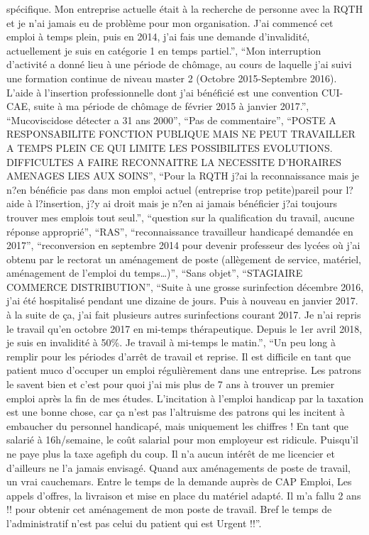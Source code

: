 \documentclass[
  letterpaper,
  DIV=11,
  numbers=noendperiod]{scrartcl}
\begin{document}
\begin{itemize}
  spécifique. Mon entreprise actuelle était à la recherche de personne
  avec la RQTH et je n'ai jamais eu de problème pour mon organisation.
  J'ai commencé cet emploi à temps plein, puis en 2014, j'ai fais une
  demande d'invalidité, actuellement je suis en catégorie 1 en temps
  partiel.'', ``Mon interruption d'activité a donné lieu à une période
  de chômage, au cours de laquelle j'ai suivi une formation continue de
  niveau master 2 (Octobre 2015-Septembre 2016). L'aide à l'insertion
  professionnelle dont j'ai bénéficié est une convention CUI-CAE, suite
  à ma période de chômage de février 2015 à janvier 2017.'',
  ``Mucoviscidose détecter a 31 ans 2000'', ``Pas de commentaire'',
  ``POSTE A RESPONSABILITE FONCTION PUBLIQUE MAIS NE PEUT TRAVAILLER A
  TEMPS PLEIN CE QUI LIMITE LES POSSIBILITES EVOLUTIONS. DIFFICULTES A
  FAIRE RECONNAITRE LA NECESSITE D'HORAIRES AMENAGES LIES AUX SOINS'',
  ``Pour la RQTH j?ai la reconnaissance mais je n?en bénéficie pas dans
  mon emploi actuel (entreprise trop petite)pareil pour l?aide à
  l?insertion, j?y ai droit mais je n?en ai jamais bénéficier j?ai
  toujours trouver mes emplois tout seul.'', ``question sur la
  qualification du travail, aucune réponse approprié'', ``RAS'',
  ``reconnaissance travailleur handicapé demandée en 2017'',
  ``reconversion en septembre 2014 pour devenir professeur des lycées où
  j'ai obtenu par le rectorat un aménagement de poste (allègement de
  service, matériel, aménagement de l'emploi du temps\ldots)'', ``Sans
  objet'', ``STAGIAIRE COMMERCE DISTRIBUTION'', ``Suite à une grosse
  surinfection décembre 2016, j'ai été hospitalisé pendant une dizaine
  de jours. Puis à nouveau en janvier 2017. à la suite de ça, j'ai fait
  plusieurs autres surinfections courant 2017. Je n'ai repris le travail
  qu'en octobre 2017 en mi-temps thérapeutique. Depuis le 1er avril
  2018, je suis en invalidité à 50\%. Je travail à mi-temps le matin.'',
  ``Un peu long à remplir pour les périodes d'arrêt de travail et
  reprise. Il est difficile en tant que patient muco d'occuper un emploi
  régulièrement dans une entreprise. Les patrons le savent bien et c'est
  pour quoi j'ai mis plus de 7 ans à trouver un premier emploi après la
  fin de mes études. L'incitation à l'emploi handicap par la taxation
  est une bonne chose, car ça n'est pas l'altruisme des patrons qui les
  incitent à embaucher du personnel handicapé, mais uniquement les
  chiffres ! En tant que salarié à 16h/semaine, le coût salarial pour
  mon employeur est ridicule. Puisqu'il ne paye plus la taxe agefiph du
  coup. Il n'a aucun intérêt de me licencier et d'ailleurs ne l'a jamais
  envisagé. Quand aux aménagements de poste de travail, un vrai
  cauchemars. Entre le temps de la demande auprès de CAP Emploi, Les
  appels d'offres, la livraison et mise en place du matériel adapté. Il
  m'a fallu 2 ans !! pour obtenir cet aménagement de mon poste de
  travail. Bref le temps de l'administratif n'est pas celui du patient
  qui est Urgent !!''.
\end{itemize}
\end{document}
